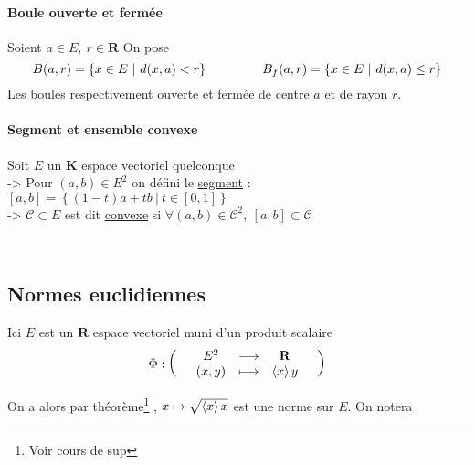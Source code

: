 			
		\traitd
		\paragraph{Boule ouverte et fermée} Soient $a\in E,~r\in\mathbf{R}$ On pose
			\[B(a,r) = \left\{ x\in E ~|~ d(x,a)<r\right\} \hspace*{1.5cm} B_f (a,r) = \left\{ x\in E ~|~ d(x,a) \leq r\right\}\]
			\hspace*{0.6cm} Les boules respectivement ouverte et fermée de centre $a$ et de rayon $r$. 
		\traitdouble
		\paragraph{Segment et ensemble convexe} Soit $E$ un $\mathbf{K}$ espace vectoriel quelconque \vspace*{0.2cm}\\
			\hspace*{0.5cm} -> Pour $(a,b)\in E^2$ on défini le \underline{segment} : $[a,b]=\left\{ (1-t)a +tb ~\vert ~t\in [0,1]\right\}$ \\
			\hspace*{0.5cm} -> $\mathcal{C} \subset E$ est dit \underline{convexe} si $\forall (a,b)\in \mathcal{C}^2,~[a,b]\subset \mathcal{C}$
		\trait 
		
		 \\

	\subsection{Normes euclidiennes}
		Ici $E$ est un $\mathbf{R}$ espace vectoriel muni d'un produit scalaire\footnotemark[1] 
		\[
			\Phi :  \appli{E^2}{(x,y)}{\mathbf{R}}{\scal{x}{y}}
		\]
			
		
		On a alors par théorème\footnote[2]{Voir cours de sup} ,  $x\mapsto \sqrt{\scal{x}{x}}$ est une norme sur $E$.  
		On notera \begin{center}  \end{center} 
		
